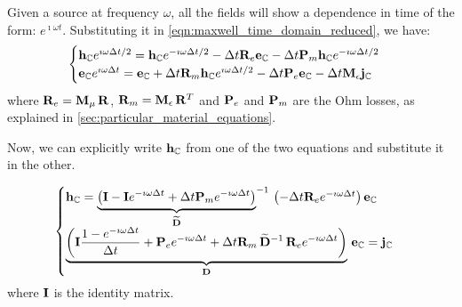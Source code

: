 Given a source at frequency $\omega$, all the fields will show a
dependence in time of the form: $e^{\imath \omega t}$. Substituting it
in \eqref{eqn:maxwell_time_domain_reduced}, we have:
\begin{equation} \label{eqn:maxwell_frequency_domain} \begin{cases}
    \mathbf{h}_{\mathbb{C}} e^{\imath \omega \Delta t/2} =
    \mathbf{h}_{\mathbb{C}} e^{-\imath \omega \Delta t/2} - \Delta t
    \mathbf{R}_e \mathbf{e}_{\mathbb{C}} - \Delta t \mathbf{P}_m
    \mathbf{h}_{\mathbb{C}} e^{-\imath \omega \Delta t/2} \\
    \mathbf{e}_{\mathbb{C}} e^{\imath \omega \Delta t} =
    \mathbf{e}_{\mathbb{C}} + \Delta t
    \mathbf{R}_m \mathbf{h}_{\mathbb{C}} e^{\imath \omega \Delta t/2} - \Delta t \mathbf{P}_e
    \mathbf{e}_{\mathbb{C}} - \Delta t \mathbf{M}_\epsilon \mathbf{j}_{\mathbb{C}}
\end{cases} \end{equation}
where $\mathbf{R}_e = {\mathbf{M}_\mu\,\mathbf{R}}$,
$\mathbf{R}_m = {\mathbf{M}_\epsilon\,{\mathbf{R}}^T}$
and $\mathbf{P}_e$ and $\mathbf{P}_m$ are the Ohm losses, as explained
in \ref{sec:particular_material_equations}.

Now, we can explicitly write $\mathbf{h}_{\mathbb{C}}$ from one of the
two equations and substitute it in the other.

\begin{equation} \label{eqn:helmholtz_discrete} \begin{cases}
    \mathbf{h}_{\mathbb{C}} = {{{\underbrace{\left( \mathbf{I}
    - \mathbf{I} e^{-\imath \omega \Delta t} + \Delta t \mathbf{P}_m
    e^{-\imath \omega \Delta t} \right)}_{\widetilde{\mathbf{D}}}}^{-1}\,\left(
    -\Delta t \mathbf{R}_e e^{-\imath \omega \Delta t}
    \right)}\,\mathbf{e}_{\mathbb{C}}} \\
    {\underbrace{\left(\mathbf{I}\frac{1-e^{-\imath \omega
    \Delta t}}{\Delta t} + \mathbf{P}_e e^{-\imath \omega \Delta t} +
    \Delta t
    {\mathbf{R}_m\,{\widetilde{\mathbf{D}}^{-1}\,\mathbf{R}_e}}e^{-\imath
    \omega \Delta t}\right)}_{\mathbf{D}}\,\mathbf{e}_{\mathbb{C}}} =
    \mathbf{j}_{\mathbb{C}}
\end{cases} \end{equation}
where $\mathbf{I}$ is the identity matrix.

